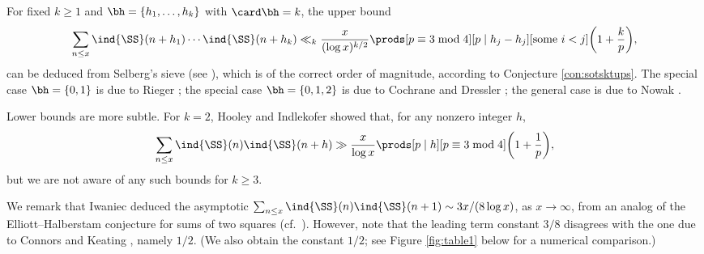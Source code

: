 \documentclass[12pt, reqno, twoside, letterpaper]{amsart}
\begin{document}
For fixed $k \ge 1$ and $\bh = \{h_1,\ldots,h_k\}$ with 
$\card \bh = k$, the upper bound 
\[
 \sum_{n \le x}
  \ind{\SS}(n + h_1)\cdots \ind{\SS}(n + h_k)
   \ll_k
    \frac{x}{(\log x)^{k/2}}
     \prods[p \equiv 3 \bmod 4][p \mid h_j - h_j][\text{some $i < j$}]
      \bigg(1 + \frac{k}{p}\bigg),
\]
can be deduced from Selberg's sieve (see \cite{SEL:77}), which is 
of the correct order of magnitude, according to 
Conjecture \ref{con:sotsktups}.
%
The special case $\bh = \{0,1\}$ is due to Rieger \cite{RIE:65}; 
the special case $\bh = \{0,1,2\}$ is due to Cochrane and Dressler 
\cite{CD:87}; the general case is due to Nowak \cite{NOW:05}.

Lower bounds are more subtle.  
%
For $k = 2$, Hooley \cite{HOO:74} and Indlekofer \cite{IND:74} 
showed that, for any nonzero integer $h$, 
\[
  \sum_{n \le x} \ind{\SS}(n)\ind{\SS}(n + h)
   \gg
    \frac{x}{\log x}
     \prods[p \mid h][p \equiv 3 \bmod 4]
      \bigg(1 + \frac{1}{p}\bigg),
\]
but we are not aware of any such bounds for $k \ge 3$.

We remark that Iwaniec deduced the asymptotic
$
 \sum_{n \le x} \ind{\SS}(n)\ind{\SS}(n + 1) \sim 3x/(8\log x)
$, 
as $x \to \infty$, from an analog of the Elliott--Halberstam 
conjecture for sums of two squares 
(cf.\ \cite[Corollary 2, (2.3)]{IWA:76}).
%
However, note that the leading term constant $3/8$ disagrees with 
the one due to Connors and Keating \cite{CK:97}, namely $1/2$.  
%
(We also obtain the constant $1/2$; see Figure \ref{fig:table1} 
below for a numerical comparison.)
\end{document}
